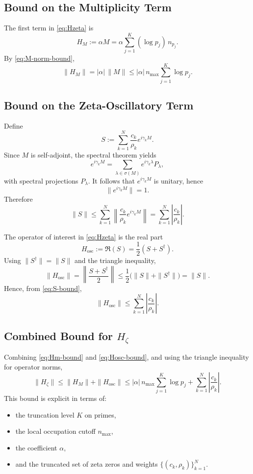 \documentclass[11pt]{article}
\begin{document}
\subsection{Bound on the Multiplicity Term}

The first term in \eqref{eq:Hzeta} is
\[
H_M := \alpha M = \alpha \sum_{j=1}^K (\log p_j)\, n_{p_j}.
\]
By \eqref{eq:M-norm-bound},
\begin{equation}
  \|H_M\| = |\alpha|\,\|M\|
           \le |\alpha|\, n_{\max} \sum_{j=1}^K \log p_j.   \label{eq:Hm-bound}
\end{equation}

\subsection{Bound on the Zeta-Oscillatory Term}

Define
\[
S := \sum_{k=1}^N \frac{c_k}{\rho_k} e^{i \gamma_k M}.
\]
Since \(M\) is self-adjoint, the spectral theorem yields
\[
e^{i \gamma_k M}
= \sum_{\lambda \in \sigma(M)} e^{i \gamma_k \lambda} P_\lambda,
\]
with spectral projections \(P_\lambda\). It follows that \(e^{i \gamma_k M}\) is unitary, hence
\[
\|e^{i \gamma_k M}\| = 1.
\]
Therefore
\begin{equation}
  \|S\|
  \le \sum_{k=1}^N \left\|\frac{c_k}{\rho_k} e^{i \gamma_k M}\right\|
  =  \sum_{k=1}^N \left|\frac{c_k}{\rho_k}\right|.  \label{eq:S-bound}
\end{equation}

The operator of interest in \eqref{eq:Hzeta} is the real part
\[
H_{\mathrm{osc}} := \Re(S) = \frac{1}{2}(S + S^\dagger).
\]
Using \(\|S^\dagger\| = \|S\|\) and the triangle inequality,
\[
\|H_{\mathrm{osc}}\|
  = \left\|\frac{S + S^\dagger}{2}\right\|
  \le \frac{1}{2}\bigl(\|S\| + \|S^\dagger\|\bigr)
  = \|S\|.
\]
Hence, from \eqref{eq:S-bound},
\begin{equation}
  \|H_{\mathrm{osc}}\|
  \le \sum_{k=1}^N \left|\frac{c_k}{\rho_k}\right|. \label{eq:Hosc-bound}
\end{equation}

\subsection{Combined Bound for \texorpdfstring{$H_\zeta$}{Hζ}}

Combining \eqref{eq:Hm-bound} and \eqref{eq:Hosc-bound}, and using the triangle inequality for operator norms,
\begin{equation}
  \|H_\zeta\|
  \le \|H_M\| + \|H_{\mathrm{osc}}\|
  \le |\alpha|\,n_{\max}\sum_{j=1}^K \log p_j
     + \sum_{k=1}^N \left|\frac{c_k}{\rho_k}\right|. \label{eq:Hzeta-norm-bound}
\end{equation}
This bound is explicit in terms of:
\begin{itemize}[nosep]
  \item the truncation level \(K\) on primes,
  \item the local occupation cutoff \(n_{\max}\),
  \item the coefficient \(\alpha\),
  \item and the truncated set of zeta zeros and weights \(\{(c_k,\rho_k)\}_{k=1}^N\).
\end{itemize}
\end{document}
